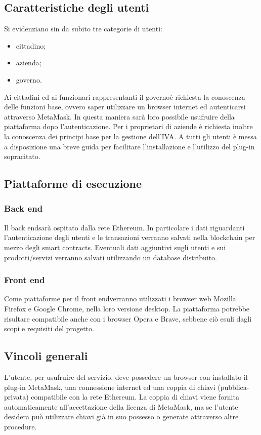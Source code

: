 \subsection{Caratteristiche degli utenti}
Si evidenziano sin da subito tre categorie di utenti:
\begin{itemize}
	\item cittadino;
	\item azienda;
	\item governo\glo.
\end{itemize}
Ai cittadini ed ai funzionari rappresentanti il governo\glosp è richiesta la conoscenza delle funzioni base, ovvero saper utilizzare un browser internet ed autenticarsi attraverso MetaMask\glo. In questa maniera sarà loro possibile usufruire  della piattaforma dopo l'autenticazione. Per i proprietari di aziende è richiesta inoltre la conoscenza dei principi base per la gestione dell'IVA. A tutti gli utenti è messa a disposizione una breve guida per facilitare l'installazione e l'utilizzo del plug-in sopracitato. 

\subsection{Piattaforme di esecuzione}
\subsubsection{Back end}
Il back end\glosp sarà ospitato dalla rete Ethereum\glo. In particolare i dati riguardanti l'autenticazione degli utenti e le transazioni verranno salvati nella blockchain per mezzo degli smart contracts\glo. Eventuali dati aggiuntivi sugli utenti e sui prodotti/servizi verranno salvati utilizzando un database distribuito.

\subsubsection{Front end}
Come piattaforme per il front end\glosp verranno utilizzati i browser web Mozilla Firefox e Google Chrome, nella loro versione desktop. La piattaforma potrebbe risultare compatibile anche con i browser Opera e Brave, sebbene ciò esuli dagli scopi e requisiti del progetto.

\subsection{Vincoli generali}
L’utente, per usufruire del servizio, deve possedere un browser con installato il plug-in MetaMask\glo, una connessione internet ed una coppia di chiavi (pubblica-privata) compatibile con la rete Ethereum\glo. La coppia di chiavi viene fornita automaticamente all'accettazione della licenza di MetaMask\glo, ma se l’utente desidera può utilizzare chiavi già in suo possesso o generate attraverso altre procedure.

 
